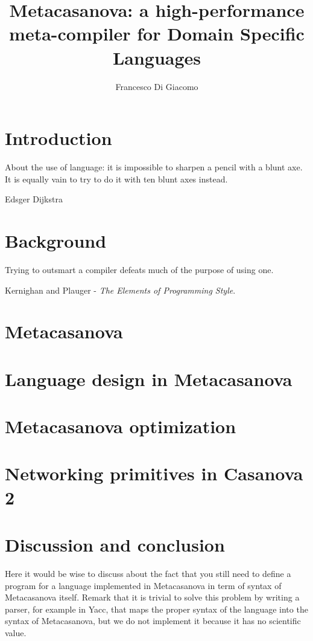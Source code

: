 \documentclass[8pt,a5paper]{extbook}
\author{Francesco Di Giacomo}
\title{Metacasanova: a high-performance meta-compiler for Domain Specific Languages}
\date { }
\theoremstyle{definition}
\begin{document}
\mainmatter
\maketitle

\tableofcontents



\chapter{Introduction}
\label{ch:introduction}
\epigraph{About the use of language: it is impossible to sharpen a pencil with a blunt axe. It is equally vain to try to do it with ten blunt axes instead.}{Edsger Dijkstra}

	

\chapter{Background}
\label{ch:background}
\epigraph{Trying to outsmart a compiler defeats much of the purpose of using one.}{Kernighan and Plauger - \textit{The Elements of Programming Style}.}

	
\chapter{Metacasanova}
\label{ch:metacasanova}
		

\chapter{Language design in Metacasanova}
\label{ch:languages}


\chapter{Metacasanova optimization}
\label{ch:functors}

	
\chapter{Networking primitives in Casanova 2}
\label{ch:networking}


\chapter{Discussion and conclusion}
\label{ch:discussion}
Here it would be wise to discuss about the fact that you still need to define a program for a language implemented in Metacasanova in term of syntax of Metacasanova itself. Remark that it is trivial to solve this problem by writing a parser, for example in Yacc, that maps the proper syntax of the language into the syntax of Metacasanova, but we do not implement it because it has no scientific value.



\end{document}

